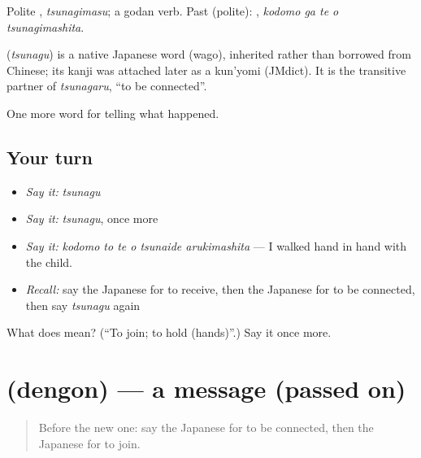 Polite \textbf{}, \emph{tsunagimasu}; a godan verb. Past (polite): \textbf{  }, \emph{kodomo ga te o tsunagimashita}.

\begin{cousinweb}
\textbf{} (\emph{tsunagu}) is a native Japanese word (wago), inherited rather than borrowed from Chinese; its kanji was attached later as a kun'yomi (JMdict). It is the transitive partner of \emph{tsunagaru}, \textquotedblleft{}to be connected\textquotedblright{}.
\end{cousinweb}

\begin{grammarlens}[title={What you've built}]
One more word for telling what happened.
\end{grammarlens}

\subsection*{Your turn}
\begin{itemize}
\raggedright
  \item \emph{Say it:} \emph{tsunagu}
  \item \emph{Say it:} \emph{tsunagu}, once more
  \item \emph{Say it:} \emph{kodomo to te o tsunaide arukimashita} — I walked hand in hand with the child.
  \item \emph{Recall:} say the Japanese for to receive, then the Japanese for to be connected, then say \emph{tsunagu} again
\end{itemize}

\begin{tcolorbox}[breakable,colback=teal!4,colframe=teal!35!black,title={Before you move on}]
What does  mean? (\textquotedblleft{}To join; to hold (hands)\textquotedblright{}.) Say it once more.
\end{tcolorbox}
\section[\texorpdfstring{\ja{でんごん} (dengon)}{でんごん (dengon)}]{ (dengon) — a message (passed on)}

\label{lesson:JA-C307-dengon}



\begin{quote}
Before the new one: say the Japanese for to be connected, then the Japanese for to join.
\end{quote}

